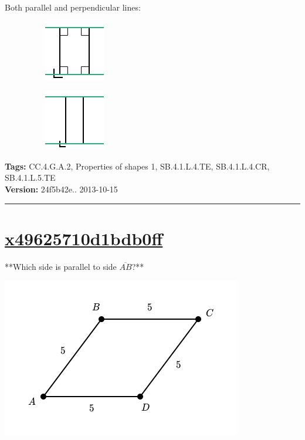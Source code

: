 \documentclass[twocolumn,10pt]{article}
\def\shrinkfactor{0.55}
\begin{document}
Both parallel and perpendicular lines:

$\phantom{xxxxxxxx}$
\includegraphics[scale=\shrinkfactor]{figures/ad42bf00e54b665d02d6e9aa787d9d04875ccc6e.png}

$\phantom{xxxxxxxx}$
\includegraphics[scale=\shrinkfactor]{figures/83e816a8326a20f4b9c025cf8634a5a1a67c87ce.png}



\medskip
\noindent
\textbf{Tags:} {\footnotesize CC.4.G.A.2, Properties of shapes 1, SB.4.1.L.4.TE, SB.4.1.L.4.CR, SB.4.1.L.5.TE}\\
\textbf{Version:} 24f5b42e.. 2013-10-15
\smallskip\hrule





\section{\href{https://www.khanacademy.org/devadmin/content/items/x49625710d1bdb0ff}{x49625710d1bdb0ff}}

\noindent
**Which side is parallel to side $\overline{AB}$?**


\includegraphics[scale=\shrinkfactor]{figures/84f3fcb82754c1a5d2b6c841c69a1a562675f88b.png}
\end{document}
